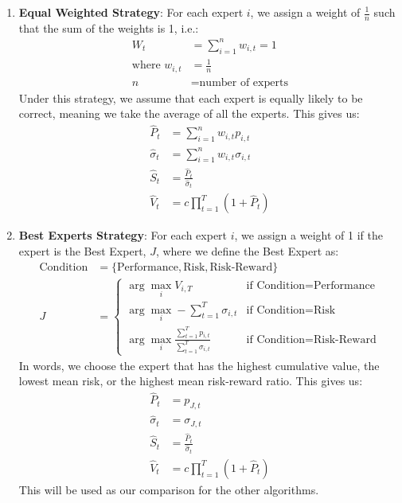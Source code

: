 \documentclass{article}
\begin{document}
\begin{enumerate}
    \item \textbf{Equal Weighted Strategy}: For each expert $i$, we assign a weight of $\frac{1}{n}$ such that the sum of the weights is 1, i.e.:
    $$\begin{align*}W_{t}&=\sum_{i=1}^{n}w_{i,t}=1\\
        \text{where }w_{i,t}&=\frac{1}{n}\\
        n&=\text{number of experts}\end{align*}$$
    Under this strategy, we assume that each expert is equally likely to be correct, meaning we take the average of all the experts. This gives us:
    $$\begin{align*}\hat{P}_{t}&=\sum_{i=1}^{n}w_{i,t}p_{i,t}\\
        \hat{\sigma}_{t}&=\sum_{i=1}^{n}w_{i,t}\sigma_{i,t}\\
        \hat{S}_{t}&=\frac{\hat{P}_{t}}{\hat{\sigma}_{t}}\\
        \hat{V}_{t}&=c\prod_{t=1}^{T}(1+\hat{P}_{t})\end{align*}$$
    \item \textbf{Best Experts Strategy}: For each expert $i$, we assign a weight of 1 if the expert is the Best Expert, $J$, where we define the Best Expert as:
        $$\begin{align*}\text{Condition}&=\{\text{Performance}, \text{Risk}, \text{Risk-Reward}\}\\
        J&=\begin{cases}\arg \max_{i}V_{i,T}&\text{if Condition=Performance}\\
        \arg\max_{i}-\sum_{t=1}^{T}\sigma_{i,t}&\text{if Condition=Risk}\\
        \arg\max_{i}\frac{\sum_{t=1}^{T}p_{i,t}}{\sum_{t=1}^{T}\sigma_{i,t}}&\text{if Condition=Risk-Reward}\end{cases}\end{align*}$$
    In words, we choose the expert that has the highest cumulative value, the lowest mean risk, or the highest mean risk-reward ratio. This gives us:
    $$\begin{align*}\hat{P}_{t}&=p_{J,t}\\
        \hat{\sigma}_{t}&=\sigma_{J,t}\\
        \hat{S}_{t}&=\frac{\hat{P}_{t}}{\hat{\sigma}_{t}}\\
        \hat{V}_{t}&=c\prod_{t=1}^{T}(1+\hat{P}_{t})\end{align*}$$
    This will be used as our comparison for the other algorithms.

\end{enumerate}
\end{document}
